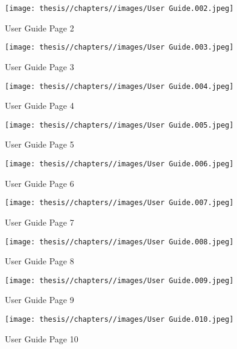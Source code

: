 \begin{figure} [H]
    \centering
    \texttt{[image: thesis//chapters//images/User Guide.002.jpeg]}
    \caption{User Guide Page 2}
     \label{fig:ug2}
\end{figure}

\begin{figure} [H]
    \centering
    \texttt{[image: thesis//chapters//images/User Guide.003.jpeg]}
    \caption{User Guide Page 3}
     \label{fig:ug3}
\end{figure}

\begin{figure} [H]
    \centering
    \texttt{[image: thesis//chapters//images/User Guide.004.jpeg]}
    \caption{User Guide Page 4}
     \label{fig:ug4}
\end{figure}

\begin{figure} [H]
    \centering
    \texttt{[image: thesis//chapters//images/User Guide.005.jpeg]}
    \caption{User Guide Page 5}
     \label{fig:ug5}
\end{figure}

\begin{figure} [H]
    \centering
    \texttt{[image: thesis//chapters//images/User Guide.006.jpeg]}
    \caption{User Guide Page 6}
     \label{fig:ug6}
\end{figure}

\begin{figure} [H]
    \centering
    \texttt{[image: thesis//chapters//images/User Guide.007.jpeg]}
    \caption{User Guide Page 7}
     \label{fig:ug7}
\end{figure}

\begin{figure} [H]
    \centering
    \texttt{[image: thesis//chapters//images/User Guide.008.jpeg]}
    \caption{User Guide Page 8}
     \label{fig:ug8}
\end{figure}

\begin{figure} [H]
    \centering
    \texttt{[image: thesis//chapters//images/User Guide.009.jpeg]}
    \caption{User Guide Page 9}
     \label{fig:ug9}
\end{figure}

\begin{figure} [H]
    \centering
    \texttt{[image: thesis//chapters//images/User Guide.010.jpeg]}
    \caption{User Guide Page 10}
     \label{fig:ug10}
\end{figure}

